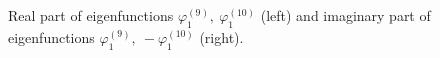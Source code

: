 \documentclass[authoryear]{elsarticle}
\begin{document}
\begin{figure}[!h]
  \begin{center}
\begin{minipage}{0.49\linewidth}
 \\
\end{minipage}
\hfill
\begin{minipage}{0.49\linewidth}
 \\
\end{minipage}
\caption{Real part of eigenfunctions $\varphi^{(9)}_1, \ \varphi^{(10)}_1$ (left) and  imaginary part of eigenfunctions $\varphi^{(9)}_1, \ - \varphi^{(10)}_1$  (right).}
\label{fig:8}
  \end{center}
\end{figure}
\end{document}
